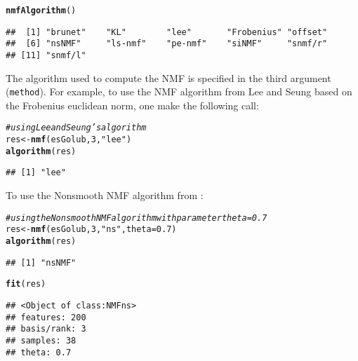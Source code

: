 \documentclass[a4paper]{article}\usepackage[]{graphicx}\usepackage[]{color}
\makeatletter
\newcommand{\hlnum}[1]{\textcolor[rgb]{0.686,0.059,0.569}{#1}}%
\newcommand{\hlstr}[1]{\textcolor[rgb]{0.192,0.494,0.8}{#1}}%
\newcommand{\hlcom}[1]{\textcolor[rgb]{0.678,0.584,0.686}{\textit{#1}}}%
\newcommand{\hlstd}[1]{\textcolor[rgb]{0.345,0.345,0.345}{#1}}%
\newcommand{\hlkwb}[1]{\textcolor[rgb]{0.69,0.353,0.396}{#1}}%
\newcommand{\hlkwc}[1]{\textcolor[rgb]{0.333,0.667,0.333}{#1}}%
\newcommand{\hlkwd}[1]{\textcolor[rgb]{0.737,0.353,0.396}{\textbf{#1}}}%
\newenvironment{kframe}{%
 \def\at@end@of@kframe{}%
 \ifinner\ifhmode%
  \def\at@end@of@kframe{\end{minipage}}%
  \begin{minipage}{\columnwidth}%
 \fi\fi%
 \def\FrameCommand##1{\hskip\@totalleftmargin \hskip-\fboxsep
 \colorbox{shadecolor}{##1}\hskip-\fboxsep
     \hskip-\linewidth \hskip-\@totalleftmargin \hskip\columnwidth}%
 \MakeFramed {\advance\hsize-\width
   \@totalleftmargin\z@ \linewidth\hsize
   \@setminipage}}%
 {\par\unskip\endMakeFramed%
 \at@end@of@kframe}
\newenvironment{knitrout}{}{} %
\let\code=\texttt
\renewcommand{\cite}[1]{\parencite{#1}}
\makeatother
\begin{document}
\begin{knitrout}
\color{fgcolor}\begin{kframe}
\begin{alltt}
\hlkwd{nmfAlgorithm}\hlstd{()}
\end{alltt}
\begin{verbatim}
##  [1] "brunet"    "KL"        "lee"       "Frobenius" "offset"   
##  [6] "nsNMF"     "ls-nmf"    "pe-nmf"    "siNMF"     "snmf/r"   
## [11] "snmf/l"
\end{verbatim}
\end{kframe}
\end{knitrout}



The algorithm used to compute the NMF is specified in the third argument (\code{method}). 
For example, to use the NMF algorithm from Lee and Seung \cite{Lee2001} based on
the Frobenius euclidean norm, one make the following call:
\begin{knitrout}
\color{fgcolor}\begin{kframe}
\begin{alltt}
\hlcom{# using Lee and Seung's algorithm}
\hlstd{res} \hlkwb{<-} \hlkwd{nmf}\hlstd{(esGolub,} \hlnum{3}\hlstd{,} \hlstr{"lee"}\hlstd{)}
\hlkwd{algorithm}\hlstd{(res)}
\end{alltt}
\begin{verbatim}
## [1] "lee"
\end{verbatim}
\end{kframe}
\end{knitrout}


To use the Nonsmooth NMF algorithm from \cite{Pascual-Montano2006}: 
\begin{knitrout}
\color{fgcolor}\begin{kframe}
\begin{alltt}
\hlcom{# using the Nonsmooth NMF algorithm with parameter theta=0.7}
\hlstd{res} \hlkwb{<-} \hlkwd{nmf}\hlstd{(esGolub,} \hlnum{3}\hlstd{,} \hlstr{"ns"}\hlstd{,} \hlkwc{theta} \hlstd{=} \hlnum{0.7}\hlstd{)}
\hlkwd{algorithm}\hlstd{(res)}
\end{alltt}
\begin{verbatim}
## [1] "nsNMF"
\end{verbatim}
\begin{alltt}
\hlkwd{fit}\hlstd{(res)}
\end{alltt}
\begin{verbatim}
## <Object of class:NMFns>
## features: 200 
## basis/rank: 3 
## samples: 38 
## theta: 0.7
\end{verbatim}
\end{kframe}
\end{knitrout}
\end{document}
